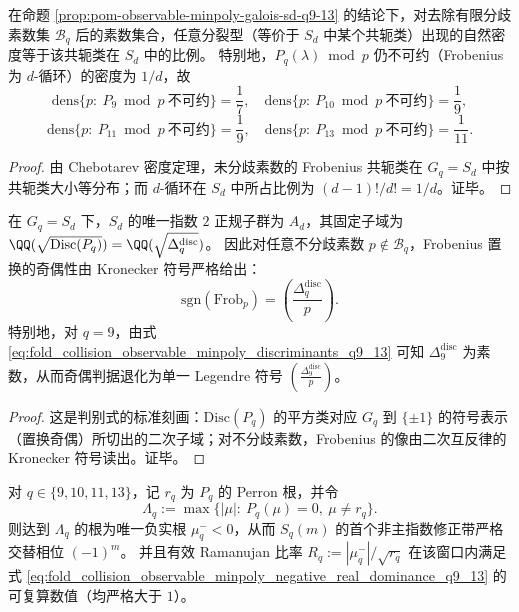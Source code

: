 \begin{corollary}\label{cor:pom-observable-minpoly-chebotarev-density-q9-13}
在命题 \ref{prop:pom-observable-minpoly-galois-sd-q9-13} 的结论下，对去除有限分歧素数集 \(\mathcal{B}_q\) 后的素数集合，任意分裂型（等价于 \(S_d\) 中某个共轭类）出现的自然密度等于该共轭类在 \(S_d\) 中的比例。
特别地，\(P_q(\lambda)\bmod p\) 仍不可约（Frobenius 为 \(d\)-循环）的密度为 \(1/d\)，故
\[
\mathrm{dens}\{p:\ P_9\bmod p\ \text{不可约}\}=\frac17,\quad
\mathrm{dens}\{p:\ P_{10}\bmod p\ \text{不可约}\}=\frac19,
\]
\[
\mathrm{dens}\{p:\ P_{11}\bmod p\ \text{不可约}\}=\frac19,\quad
\mathrm{dens}\{p:\ P_{13}\bmod p\ \text{不可约}\}=\frac1{11}.
\]
\end{corollary}
\begin{proof}
由 Chebotarev 密度定理，未分歧素数的 Frobenius 共轭类在 \(G_q=S_d\) 中按共轭类大小等分布；而 \(d\)-循环在 \(S_d\) 中所占比例为 \((d-1)!/d!=1/d\)。证毕。
\end{proof}

\begin{corollary}\label{cor:pom-observable-minpoly-frob-parity-q9-13}
在 \(G_q=S_d\) 下，\(S_d\) 的唯一指数 \(2\) 正规子群为 \(A_d\)，其固定子域为 \(\QQ(\sqrt{\mathrm{Disc}(P_q)})=\QQ(\sqrt{\Delta_q^{\mathrm{disc}}})\)。
因此对任意不分歧素数 \(p\notin\mathcal{B}_q\)，Frobenius 置换的奇偶性由 Kronecker 符号严格给出：
\[
\mathrm{sgn}(\mathrm{Frob}_p)=\left(\frac{\Delta_q^{\mathrm{disc}}}{p}\right).
\]
特别地，对 \(q=9\)，由式 \eqref{eq:fold_collision_observable_minpoly_discriminants_q9_13} 可知 \(\Delta_9^{\mathrm{disc}}\) 为素数，从而奇偶判据退化为单一 Legendre 符号 \(\left(\frac{\Delta_9^{\mathrm{disc}}}{p}\right)\)。
\end{corollary}
\begin{proof}
这是判别式的标准刻画：\(\mathrm{Disc}(P_q)\) 的平方类对应 \(G_q\) 到 \(\{\pm 1\}\) 的符号表示（置换奇偶）所切出的二次子域；对不分歧素数，Frobenius 的像由二次互反律的 Kronecker 符号读出。证毕。
\end{proof}

\begin{proposition}[负实主导律与交替修正：\texorpdfstring{$q=9,10,11,13$}{q=9,10,11,13} 的有效 Ramanujan 比率]\label{prop:pom-observable-minpoly-negative-real-dominance-q9-13}
对 \(q\in\{9,10,11,13\}\)，记 \(r_q\) 为 \(P_q\) 的 Perron 根，并令
\[
\Lambda_q:=\max\{|\mu|:\ P_q(\mu)=0,\ \mu\neq r_q\}.
\]
则达到 \(\Lambda_q\) 的根为唯一负实根 \(\mu^-_q<0\)，从而 \(S_q(m)\) 的首个非主指数修正带严格交替相位 \(({-1})^m\)。
并且有效 Ramanujan 比率
\(
R_q:=|\mu^-_q|/\sqrt{r_q}
\)
在该窗口内满足式 \eqref{eq:fold_collision_observable_minpoly_negative_real_dominance_q9_13} 的可复算数值（均严格大于 \(1\)）。
\end{proposition}

